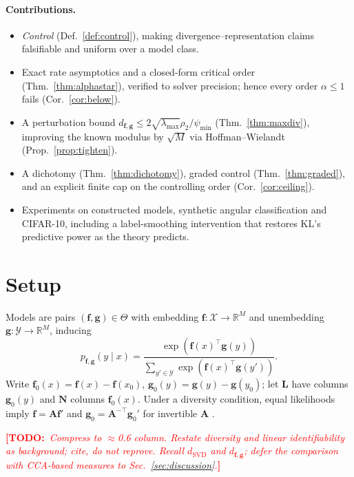 \documentclass[10pt,letterpaper,twocolumn]{article}
\newcommand{\TODO}[1]{\textcolor{red}{\small\textbf{[TODO:}~\textit{#1}\textbf{]}}}
\newcommand{\X}{\mathcal{X}}
\newcommand{\Y}{\mathcal{Y}}
\newcommand{\bff}{\mathbf{f}}
\newcommand{\bfg}{\mathbf{g}}
\newcommand{\bfL}{\mathbf{L}}
\newcommand{\bfN}{\mathbf{N}}
\newcommand{\dSVD}{d_{\mathrm{SVD}}}
\newcommand{\dfg}{d_{\bff,\bfg}}
\theoremstyle{plain}
\theoremstyle{definition}
\theoremstyle{remark}
\begin{document}
\paragraph{Contributions.}
\begin{itemize}[leftmargin=1.2em,itemsep=1pt,topsep=2pt]
\item \emph{Control} (Def.~\ref{def:control}), making divergence--representation
      claims falsifiable and uniform over a model class.
\item Exact rate asymptotics and a closed-form critical order
      (Thm.~\ref{thm:alphastar}), verified to solver precision; hence every
      order $\alpha\le1$ fails (Cor.~\ref{cor:below}).
\item A perturbation bound $\dfg\le2\sqrt{\lambda_{\max}}\rho_{2}/\psi_{\min}$
      (Thm.~\ref{thm:maxdiv}), improving the known modulus by $\sqrt{M}$ via
      Hoffman--Wielandt (Prop.~\ref{prop:tighten}).
\item A dichotomy (Thm.~\ref{thm:dichotomy}), graded control
      (Thm.~\ref{thm:graded}), and an explicit finite cap on the controlling
      order (Cor.~\ref{cor:ceiling}).
\item Experiments on constructed models, synthetic angular classification and
      CIFAR-10, including a label-smoothing intervention that restores KL's
      predictive power as the theory predicts.
\end{itemize}

\section{Setup}
\label{sec:setup}

Models are pairs $(\bff,\bfg)\in\Theta$ with embedding
$\bff:\X\to\mathbb{R}^{M}$ and unembedding $\bfg:\Y\to\mathbb{R}^{M}$, inducing
\begin{equation}
p_{\bff,\bfg}(y\mid x)=\frac{\exp(\bff(x)^{\top}\bfg(y))}
{\sum_{y'\in\Y}\exp(\bff(x)^{\top}\bfg(y'))}.
\label{eq:model}
\end{equation}
Write $\bff_{0}(x)=\bff(x)-\bff(x_{0})$, $\bfg_{0}(y)=\bfg(y)-\bfg(y_{0})$; let
$\bfL$ have columns $\bfg_{0}(y)$ and $\bfN$ columns $\bff_{0}(x)$. Under a
diversity condition, equal likelihoods imply $\bff=\mathbf{A}\bff'$ and
$\bfg_{0}=\mathbf{A}^{-\top}\bfg_{0}'$ for invertible $\mathbf{A}$
\cite{roeder2021,khemakhem2020,lachapelle2023}.

\TODO{Compress to $\approx$0.6 column. Restate diversity and linear
identifiability as background; cite, do not reprove. Recall $\dSVD$ and $\dfg$;
defer the comparison with CCA-based measures to Sec.~\ref{sec:discussion}.}
\end{document}
